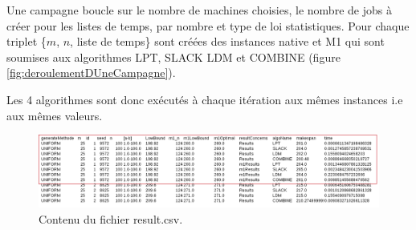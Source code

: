 \documentclass[a4paper,12pt]{report}
\theoremstyle{plain}				%
\theoremstyle{definition}				%
\begin{document}
Une campagne boucle sur le nombre de machines choisies, le nombre de jobs à créer pour les listes de temps, par nombre et type de loi statistiques. Pour chaque triplet \{$m$, $n$, liste de temps\} sont créées des instances native et M1 qui sont soumises aux algorithmes LPT, SLACK LDM et COMBINE 
 (figure \ref{fig:deroulementDUneCampagne}).

Les 4 algorithmes sont donc exécutés à chaque itération aux mêmes instances i.e aux mêmes valeurs. 

\begin{figure}
{\centering
\includegraphics[width=\columnwidth]{contenuResultCSV.png}
\caption{Contenu du fichier result.csv.}
\label{fig:contenuResultCSV}
\par}
\end{figure}
\end{document}
